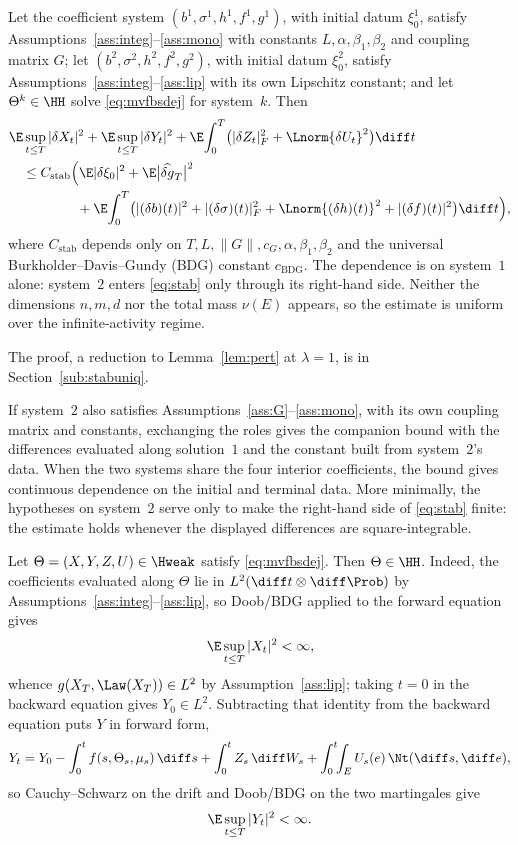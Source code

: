\begin{theorem}\label{thm:stab}
Let the coefficient system $(b^1,\sigma^1,h^1,f^1,g^1)$, with initial datum $\xi_0^1$,
satisfy Assumptions~\ref{ass:integ}--\ref{ass:mono} with constants $L,\alpha,\beta_1,\beta_2$
and coupling matrix $G$; let $(b^2,\sigma^2,h^2,f^2,g^2)$, with initial datum $\xi_0^2$,
satisfy Assumptions~\ref{ass:integ}--\ref{ass:lip} with its own Lipschitz constant; and let
$\Theta^k\in\HH$ solve \eqref{eq:mvfbsdej} for system~$k$. Then
\begin{equation}\label{eq:stab}
\begin{split}
&\E\sup_{t\le T}|\delta X_t|^2+\E\sup_{t\le T}|\delta Y_t|^2
+\E\!\int_0^T\!\big(|\delta Z_t|_F^2+\Lnorm{\delta U_t}^2\big)\diff t\\
&\quad\le C_{\mathrm{stab}}\Big(\E|\delta\xi_0|^2+\E\big|\widehat{\delta g}_T\big|^2\\
&\qquad\qquad\quad+\E\!\int_0^T\!\big(|(\delta b)(t)|^2+|(\delta\sigma)(t)|_F^2
+\Lnorm{(\delta h)(t)}^2+|(\delta f)(t)|^2\big)\diff t\Big),
\end{split}
\end{equation}
where $C_{\mathrm{stab}}$ depends only on $T,L,\|G\|,c_G,\alpha,\beta_1,\beta_2$ and the universal
Burkholder--Davis--Gundy (BDG) constant $c_{\mathrm{BDG}}$. The dependence is on
system~$1$ alone: system~$2$ enters \eqref{eq:stab} only through its right-hand side.
Neither the dimensions $n,m,d$ nor the total mass $\nu(E)$ appears, so the estimate is
uniform over the infinite-activity regime.
\end{theorem}
\noindent The proof, a reduction to Lemma~\ref{lem:pert} at $\lambda=1$, is in
Section~\ref{sub:stabuniq}.

\noindent If system~$2$ also satisfies Assumptions~\ref{ass:G}--\ref{ass:mono}, with its
own coupling matrix and constants, exchanging the roles gives the companion bound with the
differences evaluated along solution~$1$ and the constant built from system~$2$'s data.
When the two systems share the four interior coefficients, the bound gives continuous
dependence on the initial and terminal data. More minimally, the hypotheses on system~$2$
serve only to make the right-hand side of \eqref{eq:stab} finite: the estimate holds
whenever the displayed differences are square-integrable.

\begin{remark}\label{rem:cwp-class}
Let $\Theta=(X,Y,Z,U)\in\Hweak$ satisfy \eqref{eq:mvfbsdej}. Then $\Theta\in\HH$. Indeed, the coefficients evaluated along $\Theta$ lie in
$L^2(\diff t\otimes\diff\Prob)$ by Assumptions~\ref{ass:integ}--\ref{ass:lip}, so Doob/BDG
applied to the forward equation gives
\[
\E\sup_{t\le T}|X_t|^2<\infty ,
\]
whence $g(X_T,\Law(X_T))\in L^2$ by Assumption~\ref{ass:lip}; taking $t=0$ in the backward
equation gives $Y_0\in L^2$. Subtracting that identity from the backward
equation puts $Y$ in forward form,
\[
Y_t=Y_0-\int_0^t f(s,\Theta_s,\mu_s)\,\diff s+\int_0^t Z_s\,\diff W_s
+\int_0^t\!\!\int_E U_s(e)\,\Nt(\diff s,\diff e),
\]
so Cauchy--Schwarz on the drift and Doob/BDG on the two martingales give
\[
\E\sup_{t\le T}|Y_t|^2<\infty .
\]
\end{remark}

